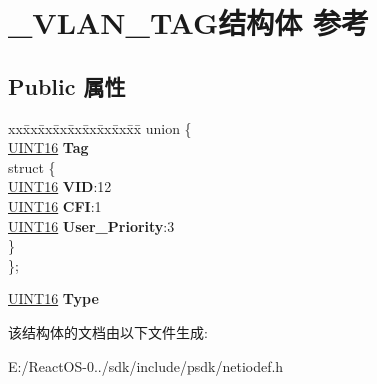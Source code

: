 \hypertarget{struct___v_l_a_n___t_a_g}{}\section{\+\_\+\+V\+L\+A\+N\+\_\+\+T\+A\+G结构体 参考}
\label{struct___v_l_a_n___t_a_g}
\subsection*{Public 属性}
\begin{DoxyCompactItemize}
\item 
\mbox{\label{struct___v_l_a_n___t_a_g_a30132475d46938a505273cd9d280ce87}} 
\begin{tabbing}
xx\=xx\=xx\=xx\=xx\=xx\=xx\=xx\=xx\=\kill
union \{\\
\>\hyperlink{_processor_bind_8h_a09f1a1fb2293e33483cc8d44aefb1eb1}{UINT16} {\bfseries Tag}\\
\mbox{\label{union___v_l_a_n___t_a_g_1_1_0D2614_ad5c6ed15e2f0ad6c75d9ab13717e9d6d}} 
\>struct \{\\
\>\>\hyperlink{_processor_bind_8h_a09f1a1fb2293e33483cc8d44aefb1eb1}{UINT16} {\bfseries VID}:12\\
\>\>\hyperlink{_processor_bind_8h_a09f1a1fb2293e33483cc8d44aefb1eb1}{UINT16} {\bfseries CFI}:1\\
\>\>\hyperlink{_processor_bind_8h_a09f1a1fb2293e33483cc8d44aefb1eb1}{UINT16} {\bfseries User\_Priority}:3\\
\>\} \\
\}; \\

\end{tabbing}\item 
\mbox{\label{struct___v_l_a_n___t_a_g_a459317a45b53cd8f55e8ec14e2e593fb}} 
\hyperlink{_processor_bind_8h_a09f1a1fb2293e33483cc8d44aefb1eb1}{U\+I\+N\+T16} {\bfseries Type}
\end{DoxyCompactItemize}


该结构体的文档由以下文件生成\+:\begin{DoxyCompactItemize}
\item 
E\+:/\+React\+O\+S-\/0../sdk/include/psdk/netiodef.\+h\end{DoxyCompactItemize}
